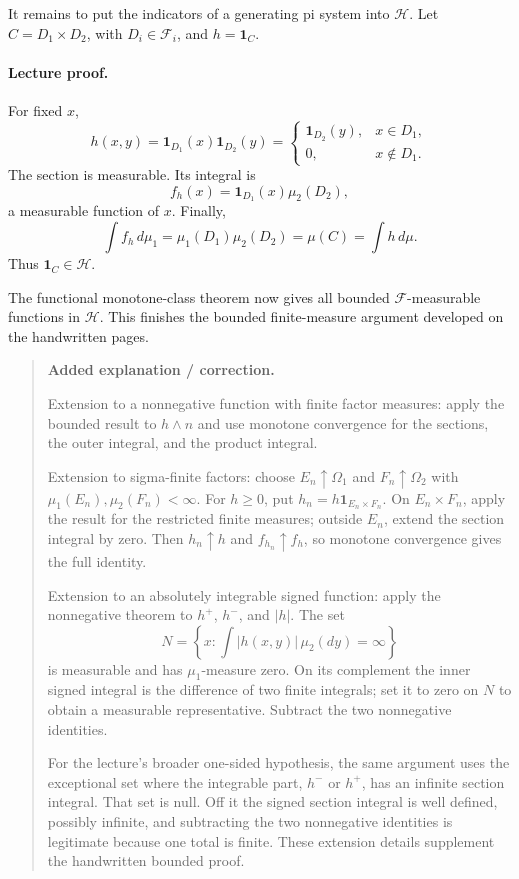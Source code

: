 \documentclass[11pt,letterpaper]{article}
\begin{document}
It remains to put the indicators of a generating pi system into $\mathcal H$. Let $C=D_1\times D_2$, with $D_i\in\mathcal F_i$, and $h=\mathbf{1}_C$.

\paragraph{Lecture proof.}
For fixed $x$, \[h(x,y)=\mathbf{1}_{D_1}(x)\mathbf{1}_{D_2}(y)=\begin{cases}\mathbf{1}_{D_2}(y),&x\in D_1,\\0,&x\notin D_1.\end{cases}\] The section is measurable. Its integral is \[f_h(x)=\mathbf{1}_{D_1}(x)\mu_2(D_2),\] a measurable function of $x$. Finally, \[\int f_h\,d\mu_1=\mu_1(D_1)\mu_2(D_2)=\mu(C)=\int h\,d\mu.\] Thus $\mathbf{1}_C\in\mathcal H$.

The functional monotone-class theorem now gives all bounded $\mathcal F$-measurable functions in $\mathcal H$. This finishes the bounded finite-measure argument developed on the handwritten pages.

\begin{quote}\small\textbf{Added explanation / correction.}

Extension to a nonnegative function with finite factor measures: apply the bounded result to $h\wedge n$ and use monotone convergence for the sections, the outer integral, and the product integral.

Extension to sigma-finite factors: choose $E_n\uparrow\Omega_1$ and $F_n\uparrow\Omega_2$ with $\mu_1(E_n),\mu_2(F_n)<\infty$. For $h\ge0$, put $h_n=h\mathbf{1}_{E_n\times F_n}$. On $E_n\times F_n$, apply the result for the restricted finite measures; outside $E_n$, extend the section integral by zero. Then $h_n\uparrow h$ and $f_{h_n}\uparrow f_h$, so monotone convergence gives the full identity.

Extension to an absolutely integrable signed function: apply the nonnegative theorem to $h^+$, $h^-$, and $|h|$. The set \[N=\left\{x:\int|h(x,y)|\,\mu_2(dy)=\infty\right\}\] is measurable and has $\mu_1$-measure zero. On its complement the inner signed integral is the difference of two finite integrals; set it to zero on $N$ to obtain a measurable representative. Subtract the two nonnegative identities.

For the lecture's broader one-sided hypothesis, the same argument uses the exceptional set where the integrable part, $h^-$ or $h^+$, has an infinite section integral. That set is null. Off it the signed section integral is well defined, possibly infinite, and subtracting the two nonnegative identities is legitimate because one total is finite. These extension details supplement the handwritten bounded proof.
\end{quote}
\end{document}
